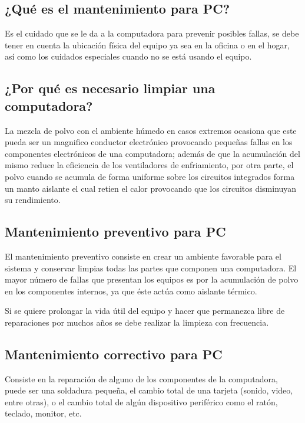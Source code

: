 \documentclass[landscape]{article}
\begin{document}
\begin{multicols}{3}

\subsection*{¿Qu\'e es el mantenimiento para PC?}

Es el cuidado que se le da a la computadora para prevenir posibles fallas, se debe tener en cuenta la ubicaci\'on f\'isica del equipo ya sea en la oficina o en el hogar, as\'i como los cuidados especiales cuando no se est\'a usando el equipo.

\subsection*{¿Por qu\'e es necesario limpiar una computadora?}

La mezcla de polvo con el ambiente h\'umedo en casos extremos ocasiona que este pueda ser un magnifico conductor electr\'onico provocando pequeñas fallas en los componentes electr\'onicos de una computadora; adem\'as de que la acumulaci\'on del mismo reduce la eficiencia de los ventiladores de enfriamiento, por otra parte, el polvo cuando se acumula de forma uniforme sobre los circuitos integrados forma un manto aislante el cual retien el calor provocando que los circuitos disminuyan su rendimiento.

 \subsection*{Mantenimiento preventivo para PC}

El mantenimiento preventivo consiste en crear un ambiente favorable para el sistema y conservar limpias todas las partes que componen una computadora. El mayor n\'umero de fallas que presentan los equipos es por la acumulaci\'on de polvo en los componentes internos, ya que \'este act\'ua como aislante t\'ermico.

Si se quiere prolongar la vida \'util del equipo y hacer que permanezca libre de reparaciones por muchos a\~nos se debe realizar la limpieza con frecuencia.

\subsection*{Mantenimiento correctivo para PC}

Consiste en la reparaci\'on de alguno de los componentes de la computadora, puede ser una soldadura peque\~na, el cambio total de una tarjeta (sonido, video, entre otras), o el cambio total de alg\'un dispositivo perif\'erico como el rat\'on, teclado, monitor, etc.


\end{multicols}
\end{document}

